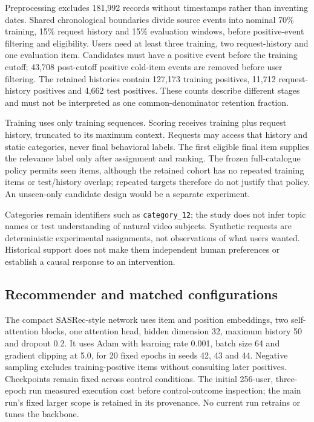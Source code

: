 \documentclass[conference]{IEEEtran}
\begin{document}
Preprocessing excludes 181,992 records without timestamps rather than inventing dates. Shared chronological boundaries divide source events into nominal 70\% training, 15\% request history and 15\% evaluation windows, before positive-event filtering and eligibility. Users need at least three training, two request-history and one evaluation item. Candidates must have a positive event before the training cutoff; 43,708 post-cutoff positive cold-item events are removed before user filtering. The retained histories contain 127,173 training positives, 11,712 request-history positives and 4,662 test positives. These counts describe different stages and must not be interpreted as one common-denominator retention fraction.

Training uses only training sequences. Scoring receives training plus request history, truncated to its maximum context. Requests may access that history and static categories, never final behavioral labels. The first eligible final item supplies the relevance label only after assignment and ranking. The frozen full-catalogue policy permits seen items, although the retained cohort has no repeated training items or test/history overlap; repeated targets therefore do not justify that policy. An unseen-only candidate design would be a separate experiment.

Categories remain identifiers such as \texttt{category\_12}; the study does not infer topic names or test understanding of natural video subjects. Synthetic requests are deterministic experimental assignments, not observations of what users wanted. Historical support does not make them independent human preferences or establish a causal response to an intervention.

\subsection{Recommender and matched configurations}
The compact SASRec-style network uses item and position embeddings, two self-attention blocks, one attention head, hidden dimension 32, maximum history 50 and dropout 0.2. It uses Adam with learning rate 0.001, batch size 64 and gradient clipping at 5.0, for 20 fixed epochs in seeds 42, 43 and 44. Negative sampling excludes training-positive items without consulting later positives. Checkpoints remain fixed across control conditions. The initial 256-user, three-epoch run measured execution cost before control-outcome inspection; the main run's fixed larger scope is retained in its provenance. No current run retrains or tunes the backbone.
\end{document}
